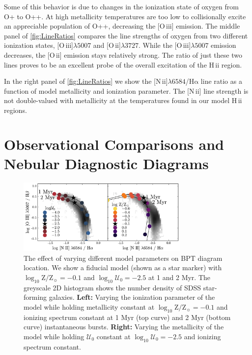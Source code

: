 \documentclass[linenumbers, tighten, trackchanges]{aastex61}%
\newcommand{\Fig}[1]{\autoref{fig:#1}}
\newcommand{\logten}{\ensuremath{\log_{10}}}
\newcommand{\nii}{[N\,{\sc ii}]\xspace}
\newcommand{\oiii}{[O\,{\sc iii}]\xspace}
\newcommand{\oii}{[O\,{\sc ii}]\xspace}
\newcommand{\ha}{\ensuremath{\mathrm{H\alpha}}}
\newcommand{\hii}{H\,{\sc ii}\xspace}
\newcommand\lam[1]{\ensuremath{\lambda #1}}
\newcommand{\logZeq}[1]{\ensuremath{\logten \mathrm{Z}/\mathrm{Z}_{\sun} = #1}}
\newcommand{\U}{\ensuremath{\mathcal{U}_{0}}}
\newcommand{\logU}{\ensuremath{\logten \mathcal{U}_0}}
\newcommand\niiha{\nii{}\lam{6584}/\ha{}}
\begin{document}
Some of this behavior is due to changes in the ionization state of oxygen from O+ to O++. At high metallicity temperatures are too low to collisionally excite an appreciable population of O++, decreasing the \oiii{} emission. The middle panel of \Fig{LineRatios} compares the line strengths of oxygen from two different ionization states, \oiii{}\lam{5007} and \oii{}\lam{3727}. While the \oiii{}\lam{5007} emission decreases, the \oii{} emission stays relatively strong. The ratio of just these two lines proves to be an excellent probe of the overall excitation of the \hii region.

In the right panel of \Fig{LineRatios} we show the \niiha{} line ratio as a function of model metallicity and ionization parameter. The \nii{} line strength is not double-valued with metallicity at the temperatures found in our model \hii regions.

\section{Observational Comparisons and Nebular Diagnostic Diagrams} \label{sec:models:diagnostics}

\begin{figure}[!htbp]
    \begin{centering}
        \includegraphics[width=0.75\textwidth]{f16.pdf}
        \caption{The effect of varying different model parameters on BPT diagram location. We show a fiducial model (shown as a star marker) with \logZeq{-0.1} and $\logU = -2.5$ at 1 and 2 Myr. The greyscale 2D histogram shows the number density of SDSS star-forming galaxies. \textbf{Left:} Varying the ionization parameter of the model while holding metallicity constant at \logZeq{-0.1} and ionizing spectrum constant at 1 Myr (top curve) and 2 Myr (bottom curve) instantaneous bursts. \textbf{Right:} Varying the metallicity of the model while holding \U{} constant at $\logU = -2.5$ and ionizing spectrum constant.}
        \label{fig:BPTintro}
    \end{centering}
\end{figure}
\end{document}

